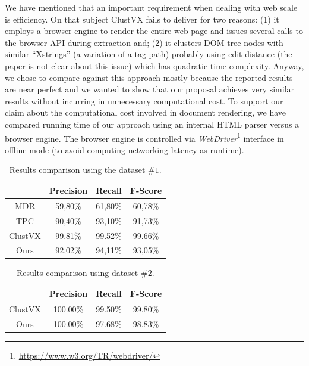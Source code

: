 We have mentioned that an important requirement when dealing with web scale is
efficiency. On that subject ClustVX fails to deliver for two reasons: (1) it
employs a browser engine to render the entire web page and issues several calls
to the browser API during extraction and; (2) it clusters DOM tree nodes with
similar ``Xstrings'' (a variation of a tag path) probably using edit distance
(the paper is not clear about this issue) which has quadratic time complexity.
Anyway, we chose to compare against this approach mostly because the reported
results are near perfect and we wanted to show that our proposal achieves very
similar results without incurring in unnecessary computational cost. To support
our claim about the computational cost involved in document rendering, we have
compared running time of our approach using an internal HTML parser versus a
browser engine. The browser engine is controlled via
\textit{WebDriver}\footnote{\url{https://www.w3.org/TR/webdriver/}} interface in
offline mode (to avoid computing networking latency as runtime).

\vspace{-0.2cm}
\begin{table}[h]
\centering
\caption{\small{Results comparison using the dataset $\#1$.}}
\label{table:compare1}
\begin{small}
\begin{tabular}
{|c| c| c| c|}\hline
	& Precision	& Recall	& F-Score\\ \hline
MDR\cite{MDR03} &	59,80\%	& 61,80\%	& 60,78\%\\ \hline
TPC\cite{TPC09}	& 90,40\%	& 93,10\%	& 91,73\%\\ \hline
ClustVX\cite{grigalis2013towards} &	99.81\% & 99.52\% & 99.66\%\\ \hline
Ours &	92,02\%	& 94,11\%	& 93,05\% \\ \hline
\end{tabular}
\end{small}
\end{table}

\vspace{-0.5cm}
\begin{table}[h]
\centering
\caption{\small{Results comparison using dataset $\#2$.}}
\label{table:compare2}
\begin{small}
\begin{tabular}
{|c| c| c| c|}\hline
	& Precision	& Recall	& F-Score\\ \hline
ClustVX\cite{grigalis2013towards} &	100.00\% & 99.50\% & 99.80\%\\ \hline
Ours &	100.00\% & 97.68\% & 98.83\% \\ \hline
\end{tabular}
\end{small}
\end{table}

